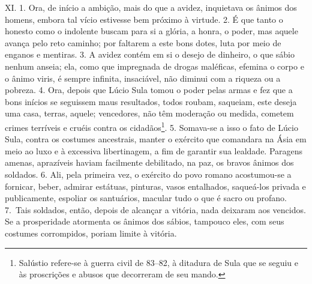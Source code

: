 XI. 1. Ora, de início a ambição, mais do que a avidez, inquietava os ânimos dos
homens, embora tal vício estivesse bem próximo à virtude. 2. É que tanto o
honesto como o indolente buscam para si a glória, a honra, o poder, mas aquele
avança pelo reto caminho; por faltarem a este bons dotes, luta por meio de
enganos e mentiras. 3. A avidez contém em si o desejo de dinheiro, o que sábio
nenhum anseia; ela, como que impregnada de drogas maléficas, efemina o corpo e
o ânimo viris, é sempre infinita, insaciável, não diminui com a riqueza ou a
pobreza. 4. Ora, depois que Lúcio Sula tomou o poder pelas armas e fez que a
bons inícios se seguissem maus resultados, todos roubam, saqueiam, este deseja
uma casa, terras, aquele; vencedores, não têm moderação ou medida, cometem
crimes terríveis e cruéis contra os cidadãos\footnote{Salústio refere-se à
guerra civil de 83--82, à ditadura de Sula que se seguiu e às proscrições e
abusos que decorreram de seu mando.}. 5. Somava-se a isso o fato de Lúcio Sula,
contra os costumes ancestrais, manter o exército que comandara na Ásia em meio
ao luxo e à excessiva libertinagem, a fim de garantir sua lealdade. Paragens
amenas, aprazíveis haviam facilmente debilitado, na paz, os bravos ânimos dos
soldados. 6. Ali, pela primeira vez, o exército do povo romano acostumou-se a
fornicar, beber, admirar estátuas, pinturas, vasos entalhados, saqueá-los
privada e publicamente, espoliar os santuários, macular tudo o que é sacro ou
profano. 7.~Tais soldados, então, depois de alcançar a vitória, nada deixaram
aos vencidos. Se a prosperidade atormenta os ânimos dos sábios, tampouco eles,
com seus costumes corrompidos, poriam limite à vitória.

